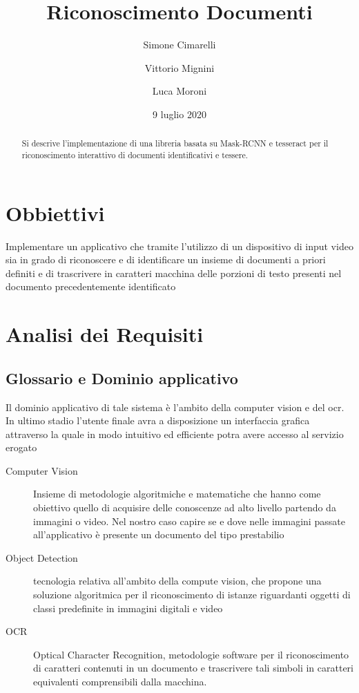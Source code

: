 \documentclass[12pt,a4paper]{article}
\begin{document}
\title{Riconoscimento Documenti}
\author{Simone Cimarelli \and Vittorio Mignini \and Luca Moroni}
\date{9 luglio 2020}

\maketitle

\begin{abstract}
    Si descrive l'implementazione di una libreria basata su Mask-RCNN e
    tesseract per il riconoscimento interattivo di documenti
    identificativi e tessere.
\end{abstract}

\section{Obbiettivi}

Implementare un applicativo che tramite l'utilizzo di un dispositivo di input video sia in
grado di riconoscere e di identificare un insieme di documenti a priori definiti
e di trascrivere in caratteri macchina delle porzioni di testo presenti nel documento precedentemente identificato

\section{Analisi dei Requisiti}
\subsection{Glossario e Dominio applicativo}

Il dominio applicativo di tale sistema è l'ambito della computer vision e del ocr.
In ultimo stadio l'utente finale avra a disposizione un interfaccia grafica attraverso la quale
in modo intuitivo ed efficiente potra avere accesso al servizio erogato 

\begin{description}

    \item[Computer Vision] Insieme di metodologie algoritmiche e matematiche che hanno come obiettivo
    quello di acquisire delle conoscenze ad alto livello partendo da immagini o video. Nel nostro caso 
    capire se e dove nelle immagini passate all'applicativo è presente un documento del tipo prestabilio

    \item[Object Detection] tecnologia relativa all'ambito della compute vision, che propone una soluzione
    algoritmica per il riconoscimento di istanze riguardanti oggetti di classi predefinite in immagini digitali e video

    \item[OCR] Optical Character Recognition, metodologie software per il riconoscimento di caratteri contenuti in un documento
    e trascrivere tali simboli in caratteri equivalenti comprensibili dalla macchina.

\end{description}
\end{document}

